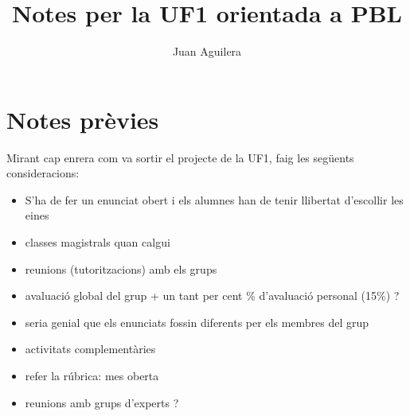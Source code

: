 \documentclass[a4paper]{article}
\begin{document}
\title{Notes per la UF1 orientada a PBL}
\author{Juan Aguilera}
\maketitle

\section{Notes prèvies}
Mirant cap enrera com va sortir el projecte de la UF1, faig les següents consideracions:

\begin{itemize}
	\item S'ha de fer un enunciat obert i els alumnes han de tenir llibertat d'escollir les eines
	\item classes magistrals quan calgui
	\item reunions (tutoritzacions) amb els grups
	\item avaluació global del grup + un tant per cent \% d'avaluació personal (15\%) ?
	\item seria genial que els enunciats fossin diferents per els membres del grup
	\item activitats complementàries
	\item refer la rúbrica: mes oberta
	\item reunions amb grups d'experts ?
\end{itemize}
\end{document}
